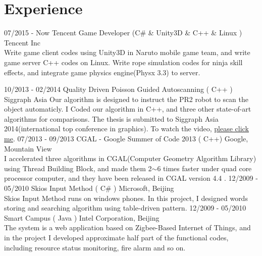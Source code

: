 \documentclass[]{friggeri-cv}
\begin{document}
\section{Experience}
\begin{entrylist}
    \entry
    {07/2015 - Now}
    {Tencent Game Developer (C\# \& Unity3D \& C++ \& Linux )}
    {Tencent Inc}
    {\emph{} %
    \\ Write game client codes using Unity3D in Naruto mobile game team, and write game server C++ codes on Linux.
    Write rope simulation codes for ninja skill effects, and integrate game physics engine(Physx 3.3) to server. }
    
    \entry
    {10/2013 - 02/2014}
    {Quality Driven Poisson Guided Autoscanning ( C++ )}
    {Siggraph Asia}
    {\emph{} %
    Our algorithm is designed to instruct the PR2 robot to scan the object automaticly. I Coded our algorithm in C++, and three other state-of-art algorithms for comparisons. The thesis is submitted to Siggraph Asia 2014(international top conference in graphics). To watch the video, \href{http://v.youku.com/v_show/id_XNzQ0NTY0Mzk2.html}{\underline{please click me}}.}
    \entry
    {07/2013 - 09/2013}
    {CGAL - Google Summer of Code 2013 ( C++)}
    {Google, Mountain View}
    {\emph{} %
    \\ I accelerated three algorithms in CGAL(Computer Geometry Algorithm Library) using Thread Building Block, and made them 2$\sim$6 times faster under quad core processor computer, and they have been released in CGAL version 4.4 .}
    \entry
    {12/2009 - 05/2010}
    {Skios Input Method ( C\# )}
    {Microsoft, Beijing}
    {\emph{} %
    \\Skios Input Method runs on windows phones. In this project, I designed words storing and searching algorithm using table-driven pattern. }
    \entry
    {12/2009 - 05/2010}
    {Smart Campus ( Java )}
    {Intel Corporation, Beijing}
    {\emph{} %
    \\The system is a web application based on Zigbee-Based Internet of Things, and in the project I developed approximate half part of the functional codes, including resource status monitoring, fire alarm and so on.}
\end{entrylist}
\end{document}
